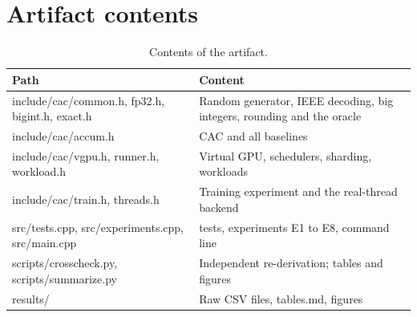 \documentclass[3p,10pt]{elsarticle}
\begin{document}
\hypertarget{artifact-contents}{%
\section{Artifact contents}\label{artifact-contents}}

\begin{table}[!htbp]\centering\small\setlength{\tabcolsep}{4pt}
\caption{Contents of the artifact.}\label{tab:24}
\begin{tabularx}{\linewidth}{>{\raggedright\arraybackslash\hsize=1.000\hsize}X>{\raggedright\arraybackslash\hsize=1.000\hsize}X}
\toprule
Path & Content \\
\midrule
include/cac/common.h, fp32.h, bigint.h, exact.h & Random generator, IEEE decoding, big integers, rounding and the oracle \\
include/cac/accum.h & CAC and all baselines \\
include/cac/vgpu.h, runner.h, workload.h & Virtual GPU, schedulers, sharding, workloads \\
include/cac/train.h, threads.h & Training experiment and the real-thread backend \\
src/tests.cpp, src/experiments.cpp, src/main.cpp & 55 tests, experiments E1 to E8, command line \\
scripts/crosscheck.py, scripts/summarize.py & Independent re-derivation; tables and figures \\
results/ & Raw CSV files, tables.md, figures \\
\bottomrule
\end{tabularx}
\end{table}
\end{document}
